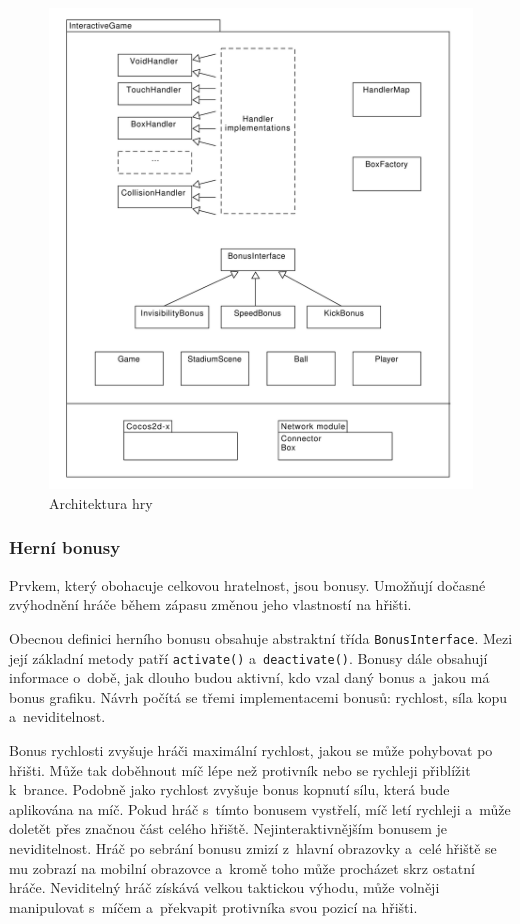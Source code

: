 \documentclass[thesis=B,czech,hidelinks]{FITthesis}[2012/06/26] %
\newcommand{\code}[1]{\texttt{#1}}
\begin{document}
\begin{figure}[h]
\includegraphics[width=\textwidth]{game_architecture}
\caption{Architektura hry}
\end{figure}

\subsubsection{Herní bonusy}

Prvkem, který obohacuje celkovou hratelnost, jsou bonusy. Umožňují dočasné zvýhodnění hráče během zápasu změnou jeho vlastností na hřišti. 

Obecnou definici herního bonusu obsahuje abstraktní třída \code{BonusInterface}. Mezi její základní metody patří \code{activate()} a~\code{deactivate()}. Bonusy dále obsahují informace o~době, jak dlouho budou aktivní, kdo vzal daný bonus a~jakou má bonus grafiku. Návrh počítá se třemi implementacemi bonusů: rychlost, síla kopu a~neviditelnost.

Bonus rychlosti zvyšuje hráči maximální rychlost, jakou se může pohybovat po hřišti. Může tak doběhnout míč lépe než protivník nebo se rychleji přiblížit k~brance.
Podobně jako rychlost zvyšuje bonus kopnutí sílu, která bude aplikována na míč. Pokud hráč s~tímto bonusem vystřelí, míč letí rychleji a~může doletět přes značnou část celého hřiště.
Nejinteraktivnějším bonusem je neviditelnost. Hráč po sebrání bonusu zmizí z~hlavní obrazovky a~celé hřiště se mu zobrazí na mobilní obrazovce a~kromě toho může procházet skrz ostatní hráče. Neviditelný hráč získává velkou taktickou výhodu, může volněji manipulovat s~míčem a~překvapit protivníka svou pozicí na hřišti.
\end{document}
